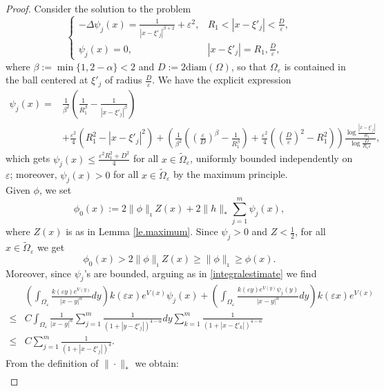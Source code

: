 \documentclass[11pt]{article}
\begin{document}
\begin{proof}
Consider the solution to the problem
$$\left\{\begin{array}{ll}
-\Delta\psi_j(x)=\frac1{\left|x-\xi'_j\right|^{\beta+2}}+\varepsilon^2,&R_1<\left|x-\xi'_j\right|<\frac D\varepsilon,\\
\psi_j(x)=0,&\left|x-\xi'_j\right|=R_1,\frac D\varepsilon,
\end{array}\right.$$
where $\beta:=\min\{1,2-\alpha\}<2$ and $D:=2\mathrm{diam}(\Omega)$, so that $\Omega_\varepsilon$ is contained in the ball centered at $\xi'_j$ of radius $\frac D\varepsilon$. We have the explicit expression
\begin{align*}\psi_j(x)=&\frac1{\beta^2}\left(\frac1{R_1^\beta}-\frac1{\left|x-\xi'_j\right|^\beta}\right)\\
&+\frac{\varepsilon^2}4\left(R_1^2-\left|x-\xi'_j\right|^2\right)+\left(\frac1{\beta^2}\left(\left(\frac\varepsilon D\right)^\beta-\frac1{R_1^\beta}\right)+\frac{\varepsilon^2}4\left(\left(\frac D\varepsilon\right)^2-R_1^2\right)\right)\frac{\log\frac{\left|x-\xi'_j\right|}{R_1}}{\log\frac D{R_1\varepsilon}},
\end{align*}
which gets $\psi_j(x)\le\frac{\varepsilon^2R_1^2+D^2}4$ for all $x\in\widetilde\Omega_\varepsilon$, uniformly bounded independently on $\varepsilon$; moreover, $\psi_j(x)>0$ for all $x\in\widetilde\Omega_\varepsilon$ by the maximum principle.\\
Given $\phi$, we set
$$\phi_0(x):=2\|\phi\|_\imath Z(x)+2\|h\|_\ast\sum_{j=1}^m\psi_j(x),$$
where $Z(x)$ is as in Lemma \ref{le.maximum}.
Since $\psi_j>0$ and $Z<\frac12$, for all $x\in\widetilde\Omega_\varepsilon$ we get
$$\phi_0(x)>2\|\phi\|_\imath Z(x)\ge\|\phi\|_\imath\ge\phi(x).$$
Moreover, since $\psi_j$'s are bounded, arguing as in \eqref{integralestimate} we find
\begin{align*}
&\left(\int_{\Omega_\varepsilon}\frac{k(\varepsilon y)e^{V(y)}}{|x-y|^\alpha}dy\right)k(\varepsilon x)e^{V(x)}\psi_j(x)+\left(\int_{\Omega_\varepsilon}\frac{k(\varepsilon y)e^{V(y)}\psi_j(y)}{|x-y|^\alpha}dy\right)k(\varepsilon x)e^{V(x)}\\
\le&C\int_{\Omega_\varepsilon}\frac1{|x-y|^\alpha}\sum_{j=1}^m\frac1{\left(1+\left|y-\xi'_j\right|\right)^{4-\alpha}}dy
\sum_{k=1}^m\frac1{\left(1+\left|x-\xi'_k\right|\right)^{4-\alpha}}\\
\le&C\sum_{j=1}^m\frac1{\left(1+\left|x-\xi'_j\right|\right)^4}.
\end{align*}
From the definition of $\|\cdot\|_\ast$ we obtain:
\begin{align*}

\end{align*}
\end{proof}
\end{document}
